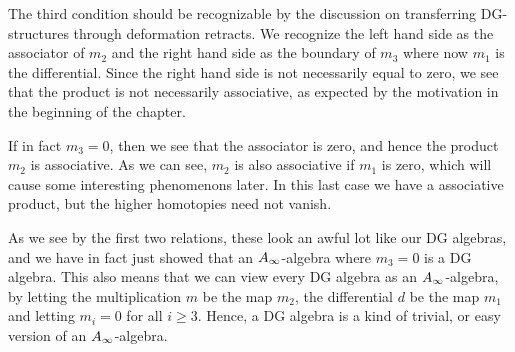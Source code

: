 The third condition should be recognizable by the discussion on transferring DG-structures through deformation retracts. We recognize the left hand side as the associator of $m_2$ and the right hand side as the boundary of $m_3$ where now $m_1$ is the differential. Since the right hand side is not necessarily equal to zero, we see that the product is not necessarily associative, as expected by the motivation in the beginning of the chapter. 

If in fact $m_3 = 0$, then we see that the associator is zero, and hence the product $m_2$ is associative.  As we can see, $m_2$ is also associative if $m_1$ is zero, which will cause some interesting phenomenons later. In this last case we have a associative product, but the higher homotopies need not vanish. 

As we see by the first two relations, these look an awful lot like our DG algebras, and we have in fact just showed that an $A_{\infty}$-algebra where $m_3 = 0$ is a DG algebra. This also means that we can view every DG algebra as an $A_{\infty}$-algebra, by letting the multiplication $m$ be the map $m_2$, the differential $d$ be the map $m_1$ and letting $m_i=0$ for all $i\geq 3$. Hence, a DG algebra is a kind of trivial, or easy version of an $A_{\infty}$-algebra. 


